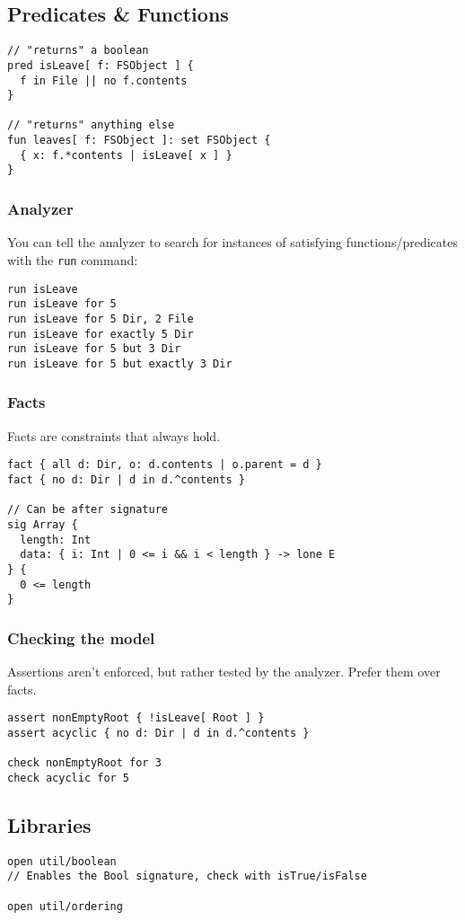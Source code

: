 \documentclass[11pt]{article}
\begin{document}
\subsection{Predicates \& Functions}
\label{sec:orgca06e51}

\begin{verbatim}
// "returns" a boolean
pred isLeave[ f: FSObject ] {
  f in File || no f.contents
}

// "returns" anything else
fun leaves[ f: FSObject ]: set FSObject {
  { x: f.*contents | isLeave[ x ] }
}
\end{verbatim}

\subsubsection{Analyzer}
\label{sec:org66e012b}

You can tell the analyzer to search for instances of satisfying functions/predicates with the \texttt{run} command:
\begin{verbatim}
run isLeave
run isLeave for 5
run isLeave for 5 Dir, 2 File
run isLeave for exactly 5 Dir
run isLeave for 5 but 3 Dir
run isLeave for 5 but exactly 3 Dir
\end{verbatim}

\subsubsection{Facts}
\label{sec:orgb9a30de}

Facts are constraints that always hold.

\begin{verbatim}
fact { all d: Dir, o: d.contents | o.parent = d }
fact { no d: Dir | d in d.^contents }

// Can be after signature
sig Array {
  length: Int
  data: { i: Int | 0 <= i && i < length } -> lone E
} {
  0 <= length 
}
\end{verbatim}

\subsubsection{Checking the model}
\label{sec:org11051ce}

Assertions aren't enforced, but rather tested by the analyzer. Prefer them over facts.
\begin{verbatim}
assert nonEmptyRoot { !isLeave[ Root ] }
assert acyclic { no d: Dir | d in d.^contents }

check nonEmptyRoot for 3
check acyclic for 5
\end{verbatim}


\subsection{Libraries}
\label{sec:orgf2001cc}

\begin{verbatim}
open util/boolean
// Enables the Bool signature, check with isTrue/isFalse

open util/ordering
\end{verbatim}
\end{document}
